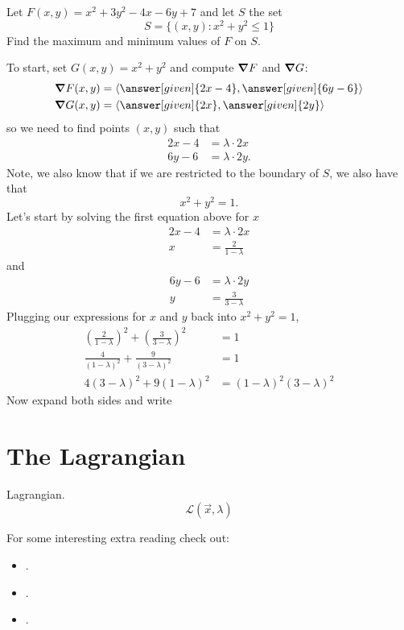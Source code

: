 \documentclass{ximera}
\begin{document}
\begin{example}
  Let $F(x,y) = x^2+3y^2-4x-6y+7$ and let $S$ the set
  \[
  S = \{(x,y):x^2 + y^2 \le 1\}
  \]
  Find the maximum and minimum values of $F$ on $S$.
  \begin{explanation}
    To start, set $G(x,y) = x^2+y^2$ and compute $\boldsymbol\nabla F$ and $\boldsymbol\nabla
    G$:
    \begin{align*}
      \grad F(x,y) &= \vector{\answer[given]{2x-4},\answer[given]{6y-6}}\\
      \grad G(x,y) &= \vector{\answer[given]{2x},\answer[given]{2y}}
    \end{align*}
    so we need to find points $(x,y)$ such that
    \begin{align*}
      2x-4 &=\lambda \cdot 2x\\
      6y-6 &=\lambda \cdot 2y.
    \end{align*}
    Note, we also know that if we are restricted to the boundary of
    $S$, we also have that
    \[
    x^2 + y^2 = 1.
    \]
    Let's start by solving the first equation above for $x$
    \begin{align*}
      2x-4 &=\lambda \cdot 2x\\
      x &= \frac{2}{1-\lambda}
    \end{align*}
    and
    \begin{align*}
      6y-6 &= \lambda\cdot 2y\\
      y &= \frac{3}{3-\lambda}
    \end{align*}
    Plugging our expressions for $x$ and $y$ back into $x^2 + y^2 = 1$,
    \begin{align*}
    \left(\frac{2}{1-\lambda}\right)^2 + \left(\frac{3}{3-\lambda}\right)^2 &=1\\
    \frac{4}{(1-\lambda)^2} + \frac{9}{(3-\lambda)^2} &=1\\
    4(3-\lambda)^2 + 9(1-\lambda)^2 &= (1-\lambda)^2(3-\lambda)^2 
    \end{align*}
    Now expand both sides and write
  \end{explanation}
\end{example}



\section{The Lagrangian}

Lagrangian.
\[
\mathcal{L}(\vec{x},\lambda)
\]



For some interesting extra reading check out:
\begin{itemize}
\item {}.
\item {}.
\item {}.
\end{itemize}
\end{document}
